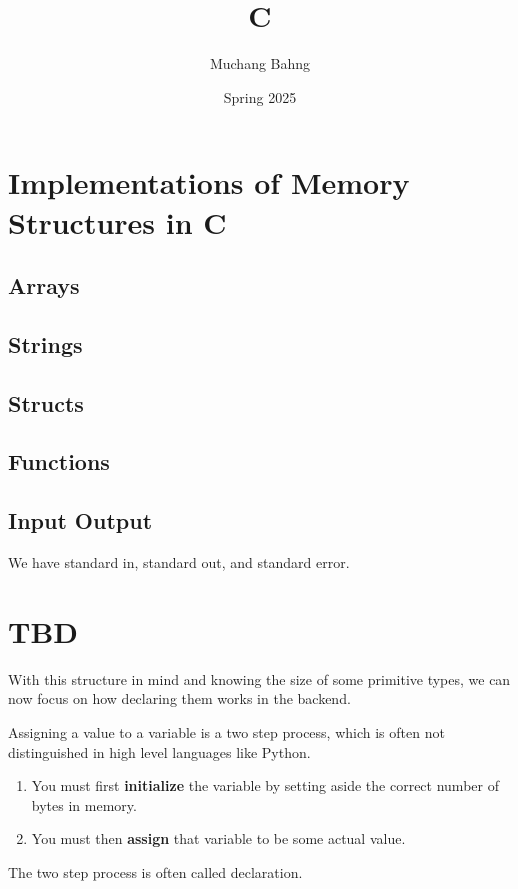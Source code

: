 \documentclass{article}
\newcounter{definition}[section]
\begin{document}
\title{C}
\author{Muchang Bahng}
\date{Spring 2025}

\maketitle
\tableofcontents
\pagebreak

\section{Implementations of Memory Structures in C} 

  \subsection{Arrays}

  \subsection{Strings}

  \subsection{Structs}

  \subsection{Functions}

  \subsection{Input Output}
    
    We have standard in, standard out, and standard error. 


\section{TBD} 

  With this structure in mind and knowing the size of some primitive types, we can now focus on how declaring them works in the backend. 

  \begin{definition}
    \label{def:declaration-initialization}
    Assigning a value to a variable is a two step process, which is often not distinguished in high level languages like Python. 
    \begin{enumerate}
      \item You must first \textbf{initialize} the variable by setting aside the correct number of bytes in memory. 
      \item You must then \textbf{assign} that variable to be some actual value. 
    \end{enumerate}
    The two step process is often called declaration. 
  \end{definition}
\end{document}
